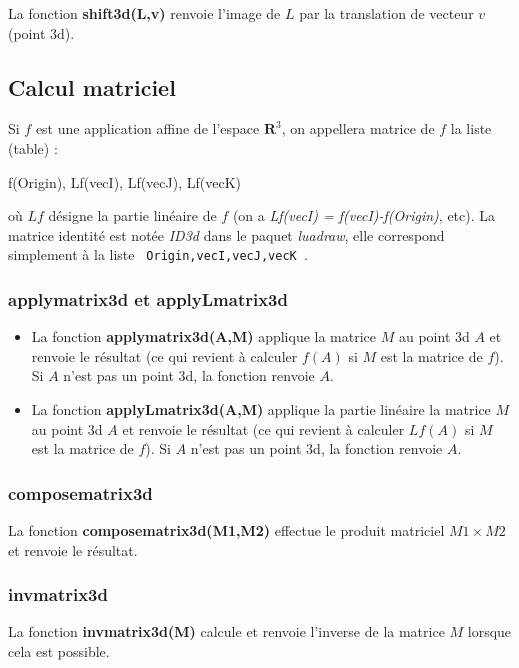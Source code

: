 La fonction \textbf{shift3d(L,v)} renvoie l'image de $L$ par la translation de vecteur $v$ (point 3d).

\subsection{Calcul matriciel}

Si $f$ est une application affine de l'espace $\mathbf R^3$, on appellera matrice de $f$ la liste (table) :
\begin{Luacode}
{ f(Origin), Lf(vecI), Lf(vecJ), Lf(vecK) }
\end{Luacode}
où $Lf$ désigne la partie linéaire de $f$ (on a \emph{Lf(vecI) = f(vecI)-f(Origin)}, etc). La matrice identité est notée \emph{ID3d} dans le paquet \emph{luadraw}, elle correspond simplement à la liste \texttt{ {Origin,vecI,vecJ,vecK} }.

\subsubsection{applymatrix3d et applyLmatrix3d}

\begin{itemize}
    \item La fonction \textbf{applymatrix3d(A,M)} applique la matrice $M$ au point 3d $A$ et renvoie le résultat (ce qui revient à calculer $f(A)$ si $M$ est la matrice de $f$). Si $A$ n'est pas un point 3d, la fonction renvoie $A$.
    
    \item La fonction \textbf{applyLmatrix3d(A,M)} applique la partie linéaire la matrice $M$ au point 3d $A$ et renvoie le résultat (ce qui revient à calculer $Lf(A)$ si $M$ est la matrice de $f$). Si $A$ n'est pas un point 3d, la fonction renvoie $A$.
\end{itemize}

\subsubsection{composematrix3d}
La fonction \textbf{composematrix3d(M1,M2)} effectue le produit matriciel $M1\times M2$ et renvoie le résultat.

\subsubsection{invmatrix3d}
La fonction \textbf{invmatrix3d(M)} calcule et renvoie l'inverse de la matrice $M$ lorsque cela est possible.

